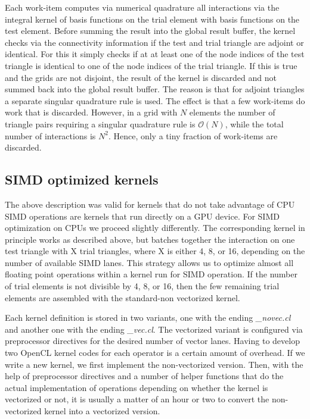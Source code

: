 Each work-item computes via numerical quadrature all interactions via the integral kernel of basis functions on the trial element with basis functions on the test element. Before summing the result into the global result buffer, the kernel checks via the connectivity information if the test and trial triangle are adjoint or identical. For this it simply checks if at at least one of the node indices of the test triangle is identical to one of the node indices of the trial triangle. If this is true and the grids are not disjoint, the result of the kernel is discarded and not summed back into the global result buffer. The reason is that for adjoint triangles a separate singular quadrature rule is used. The effect is that a few work-items do work that is discarded. However, in a grid with $N$ elements the number of triangle pairs requiring a singular quadrature rule is $\mathcal{O}(N)$, while the total number of interactions is $N^2$. Hence, only a tiny fraction of work-items are discarded.

\subsection{SIMD optimized kernels}

The above description was valid for kernels that do not take advantage of CPU SIMD operations are kernels that run directly on a GPU device. For SIMD optimization on CPUs we proceed slightly differently. The corresponding kernel in principle works as described above, but batches together the interaction on one test triangle with X trial triangles, where X is either 4, 8, or 16, depending on the number of available SIMD lanes. This strategy allows us to optimize almost all floating point operations within a kernel run for SIMD operation. If the number of trial elements is not divisible by 4, 8, or 16, then the few remaining trial elements are assembled with the standard-non vectorized kernel.

Each kernel definition is stored in two variants, one with the ending \textit{\_novec.cl} and another one with the ending \textit{\_vec.cl}. The vectorized variant is configured via preprocessor directives for the desired number of vector lanes. Having to develop two OpenCL kernel codes for each operator is a certain amount of overhead. If we write a new kernel, we first implement the non-vectorized version. Then, with the help of preprocessor directives and a number of helper functions that do the actual implementation of operations depending on whether the kernel is vectorized or not, it is usually a matter of an hour or two to convert the non-vectorized kernel into a vectorized version.


